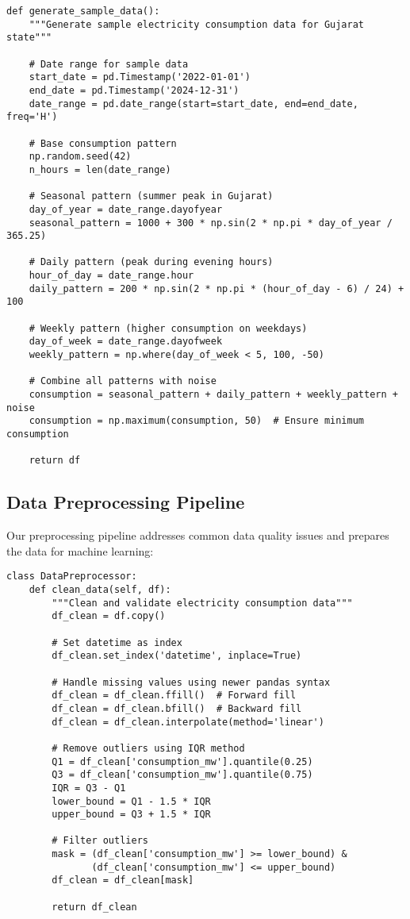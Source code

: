 \documentclass[12pt,a4paper]{article}
\begin{document}
\begin{lstlisting}[caption={Sample Data Generation Function}]
def generate_sample_data():
    """Generate sample electricity consumption data for Gujarat state"""
    
    # Date range for sample data
    start_date = pd.Timestamp('2022-01-01')
    end_date = pd.Timestamp('2024-12-31')
    date_range = pd.date_range(start=start_date, end=end_date, freq='H')
    
    # Base consumption pattern
    np.random.seed(42)
    n_hours = len(date_range)
    
    # Seasonal pattern (summer peak in Gujarat)
    day_of_year = date_range.dayofyear
    seasonal_pattern = 1000 + 300 * np.sin(2 * np.pi * day_of_year / 365.25)
    
    # Daily pattern (peak during evening hours)
    hour_of_day = date_range.hour
    daily_pattern = 200 * np.sin(2 * np.pi * (hour_of_day - 6) / 24) + 100
    
    # Weekly pattern (higher consumption on weekdays)
    day_of_week = date_range.dayofweek
    weekly_pattern = np.where(day_of_week < 5, 100, -50)
    
    # Combine all patterns with noise
    consumption = seasonal_pattern + daily_pattern + weekly_pattern + noise
    consumption = np.maximum(consumption, 50)  # Ensure minimum consumption
    
    return df
\end{lstlisting}

\subsection{Data Preprocessing Pipeline}
Our preprocessing pipeline addresses common data quality issues and prepares the data for machine learning:

\begin{lstlisting}[caption={Data Preprocessing Class}]
class DataPreprocessor:
    def clean_data(self, df):
        """Clean and validate electricity consumption data"""
        df_clean = df.copy()
        
        # Set datetime as index
        df_clean.set_index('datetime', inplace=True)
        
        # Handle missing values using newer pandas syntax
        df_clean = df_clean.ffill()  # Forward fill
        df_clean = df_clean.bfill()  # Backward fill
        df_clean = df_clean.interpolate(method='linear')
        
        # Remove outliers using IQR method
        Q1 = df_clean['consumption_mw'].quantile(0.25)
        Q3 = df_clean['consumption_mw'].quantile(0.75)
        IQR = Q3 - Q1
        lower_bound = Q1 - 1.5 * IQR
        upper_bound = Q3 + 1.5 * IQR
        
        # Filter outliers
        mask = (df_clean['consumption_mw'] >= lower_bound) & 
               (df_clean['consumption_mw'] <= upper_bound)
        df_clean = df_clean[mask]
        
        return df_clean
\end{lstlisting}
\end{document}
